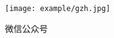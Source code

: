 \begin{pre}
	\thispagestyle{empty}
	\begin{center}
		{}
	\end{center}

\vspace*{5\baselineskip}
\centerline{\texttt{[image: example/gzh.jpg]}}
\centerline{\fontsize{26pt}{26pt} 微信公众号}
\end{pre}
